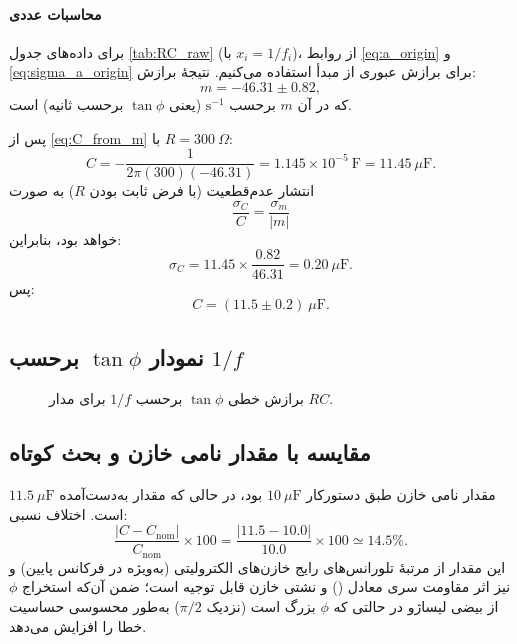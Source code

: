 \documentclass[a4paper, 11pt]{article}
\begin{document}
\paragraph{محاسبات عددی}
برای داده‌های جدول \ref{tab:RC_raw} (با \(x_i=1/f_i\))، از روابط \eqref{eq:a_origin} و \eqref{eq:sigma_a_origin} برای برازش عبوری از مبدأ استفاده می‌کنیم. نتیجهٔ برازش:
\[
m = -46.31\pm 0.82,
\]
که در آن \(m\) برحسب \(\mathrm{s^{-1}}\) (یعنی \(\tan\phi\) برحسب ثانیه) است.

پس از \eqref{eq:C_from_m} با \(R=300~\Omega\):
\[
C = -\frac{1}{2\pi(300)(-46.31)}=1.145\times 10^{-5}\ \mathrm{F}=11.45\ \mu\mathrm{F}.
\]
انتشار عدم‌قطعیت (با فرض ثابت بودن \(R\)) به صورت
\[
\frac{\sigma_C}{C}=\frac{\sigma_m}{|m|}
\]
خواهد بود، بنابراین:
\[
\sigma_C = 11.45\times\frac{0.82}{46.31}=0.20\ \mu\mathrm{F}.
\]
پس:
\[
\boxed{C=(11.5\pm 0.2)\ \mu\mathrm{F}.}
\]

\subsection{نمودار \(\tan\phi\) برحسب \(1/f\)}

\begin{figure}[h!]
\centering
{}
\caption{برازش خطی \(\tan\phi\) برحسب \(1/f\) برای مدار $RC$.}
\label{fig:tan_invf_RC}
\end{figure}

\subsection{مقایسه با مقدار نامی خازن و بحث کوتاه}

مقدار نامی خازن طبق دستورکار \(10~\mu\mathrm{F}\) بود، در حالی که مقدار به‌دست‌آمده \(11.5~\mu\mathrm{F}\) است. اختلاف نسبی:
\[
\frac{|C-C_{\mathrm{nom}}|}{C_{\mathrm{nom}}}\times 100
=
\frac{|11.5-10.0|}{10.0}\times 100
\simeq 14.5\%.
\]
این مقدار از مرتبهٔ تلورانس‌های رایج خازن‌های الکترولیتی (به‌ویژه در فرکانس پایین) و نیز اثر مقاومت سری معادل () و نشتی خازن قابل توجیه است؛ ضمن آن‌که استخراج \(\phi\) از بیضی لیساژو در حالتی که \(\phi\) بزرگ است (نزدیک \(\pi/2\)) به‌طور محسوسی حساسیت خطا را افزایش می‌دهد.
\end{document}
